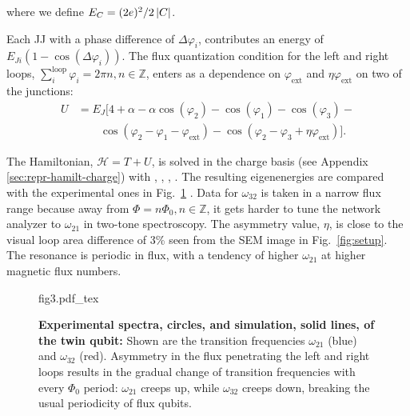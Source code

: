 \noindent where we define $ E_{C}={(2e)^{2}}/{2 \left|C\right| } $.

Each  JJ  with  a  phase  difference  of  $\Delta\varphi_{i}$,  contributes  an  energy  of
$ E_{Ji}\left(1 - \cos(\Delta\varphi_i)\right) $.   The flux quantization condition for the
left                     and                    right                     loops,
$ \sum_{i}^{\text{loop}}  \varphi_i = 2\pi  n, n \in \mathbb{Z}$,  enters as a  dependence on
$ \varphi_\text{ext} $ and $ \eta\varphi_\text{ext} $ on two of the junctions:
\begin{equation}\label{eq:potential}
  \begin{aligned}
    U & = E_J\big[4 + \alpha - \alpha\cos(\varphi_{2}) -\cos(\varphi_{1}) -\cos(\varphi_{3}) - \\
    &  \qquad  \cos(\varphi_{2}   -  \varphi_{1}  -  \varphi_{\text{ext}})  -  \cos(\varphi_{2}   -  \varphi_{3}  +
    \eta\varphi_{\text{ext}})\big].
  \end{aligned}
\end{equation}

The  Hamiltonian, $\mathcal{H}= T + U$, is  solved  in  the charge  basis (see  Appendix
\ref{sec:repr-hamilt-charge})  with
, , , . The resulting eigenenergies   are    compared    with    the    experimental    ones    in
Fig.~\ref{fig:experiment} .  Data for $ \omega_{32} $ is taken in a narrow flux range
because away from $ \Phi = n \Phi_0, n\in\mathbb{Z} $, it gets harder to tune the network analyzer to
$ \omega_{21} $  in two-tone spectroscopy.  The  asymmetry value, $ \eta $,  is close to
the  visual   loop  area  difference  of   3\%  seen  from  the   SEM  image  in
Fig.~\ref{fig:setup}.  The  resonance is  periodic in flux,  with a  tendency of
higher $\omega_{21}$ at higher magnetic flux numbers.

\begin{figure}[h]
  \centering\def\svgwidth{8cm}{fig3.pdf_tex}
  \caption{\small \textbf{Experimental spectra, circles, and  simulation, solid lines, of the
      twin  qubit:}   Shown  are   the  transition   frequencies  $   \omega_{21}  $   (blue)  and
    $ \omega_{32}$ (red).  Asymmetry  in the flux penetrating the left and  right loops results in
    the  gradual   change  of   transition  frequencies   with  every   $  \Phi_{0}   $  period:
    $\omega_{21}$ creeps  up, while $\omega_{32}$ creeps  down, breaking the usual  periodicity of flux
    qubits.  \label{fig:experiment}}
\end{figure}
 
